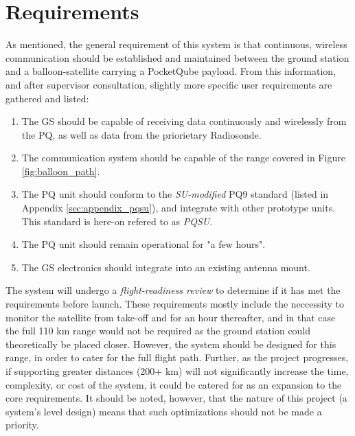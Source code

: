 \section{Requirements}

As mentioned, the general requirement of this system is that continuous, wireless communication should be established and maintained between the ground station and a balloon-satellite carrying a PocketQube payload. From this information, and after supervisor consultation, slightly more specific user requirements are gathered and listed:
\begin{enumerate}
    \item The GS should be capable of receiving data continuously and wirelessly from the PQ, as well as data from the priorietary Radiosonde.
    \item The communication system should be capable of the range covered in Figure \ref{fig:balloon_path}.
    \item The PQ unit should conform to the \textit{SU-modified} PQ9 standard (listed in Appendix \ref{sec:appendix_pqsu}), and integrate with other prototype units. This standard is here-on refered to as \textit{PQSU}.
    \item The PQ unit should remain operational for "a few hours".
    \item The GS electronics should integrate into an existing antenna mount.
\end{enumerate}

The system will undergo a \textit{flight-readiness review} to determine if it has met the requirements before launch. These requirements mostly include the neccessity to monitor the satellite from take-off and for an hour thereafter, and in that case the full 110 km range would not be required as the ground station could theoretically be placed closer. However, the system should be designed for this range, in order to cater for the full flight path. Further, as the project progresses, if supporting greater distances (200+ km) will not significantly increase the time, complexity, or cost of the system, it could be catered for as an expansion to the core requirements. It should be noted, however, that the nature of this project (a system's level design) means that such optimizations should not be made a priority.